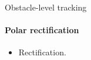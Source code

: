 \begin{frame}[plain]{Obstacle-level tracking}
  \framesubtitle{Polar rectification}
  \begin{itemize}
    \item<1-> Rectification.
  \end{itemize}
  \begin{overlayarea}{\textwidth}{\textheight}
\end{overlayarea}
\end{frame}
